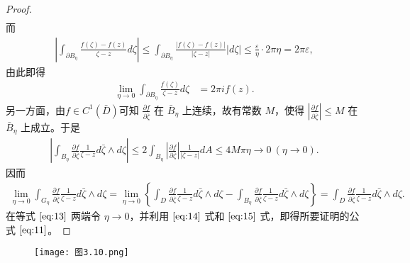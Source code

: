 \documentclass[../../main.tex]{subfiles}
\begin{document}
\begin{proof}
\begin{align*}
\end{align*}
而
\begin{align*}
\left| \int_{\partial B_\eta} \frac{f(\zeta) - f(z)}{\zeta - z} d\zeta \right| \leqslant \int_{\partial B_\eta} \frac{|f(\zeta) - f(z)|}{|\zeta - z|} |d\zeta| \leqslant \frac{\varepsilon}{\eta} \cdot 2\pi \eta = 2\pi \varepsilon,
\end{align*}
由此即得
\begin{align}
\lim_{\eta \to 0} \int_{\partial B_\eta} \frac{f(\zeta)}{\zeta - z} d\zeta &= 2\pi i f(z). \label{eq:14}
\end{align}
另一方面，由\( f \in C^1(\bar{D}) \)可知 \( \frac{\partial f}{\partial \bar{\zeta}} \) 在 \( \bar{B}_\eta \) 上连续，故有常数 \( M \)，使得 \( \left| \frac{\partial f}{\partial \bar{\zeta}} \right| \leqslant M \) 在 \( \bar{B}_\eta \) 上成立。于是
\begin{align*}
\left| \int_{B_\eta} \frac{\partial f}{\partial \bar{\zeta}} \frac{1}{\zeta - z} d\bar{\zeta} \wedge d\zeta \right| \leqslant 2 \int_{B_\eta} \left| \frac{\partial f}{\partial \bar{\zeta}} \right| \frac{1}{|\zeta - z|} dA \leqslant 4M \pi \eta \to 0 \ (\eta \to 0).
\end{align*}
因而
\begin{align}
\lim_{\eta \to 0} \int_{G_\eta} \frac{\partial f}{\partial \bar{\zeta}} \frac{1}{\zeta - z} d\bar{\zeta} \wedge d\zeta = \lim_{\eta \to 0} \left\{ \int_D \frac{\partial f}{\partial \bar{\zeta}} \frac{1}{\zeta - z} d\bar{\zeta} \wedge d\zeta - \int_{B_\eta} \frac{\partial f}{\partial \bar{\zeta}} \frac{1}{\zeta - z} d\bar{\zeta} \wedge d\zeta \right\} = \int_D \frac{\partial f}{\partial \bar{\zeta}} \frac{1}{\zeta - z} d\bar{\zeta} \wedge d\zeta. \label{eq:15}
\end{align}
在等式 \(\eqref{eq:13}\) 两端令 \( \eta \to 0 \)，并利用 \(\eqref{eq:14}\) 式和 \(\eqref{eq:15}\) 式，即得所要证明的公式 \(\eqref{eq:11}\)。
\end{proof}

\begin{figure}[H]
\centering
\texttt{[image: 图3.10.png]}
\caption{}
\label{figure:图3.10}
\end{figure}
\end{document}

